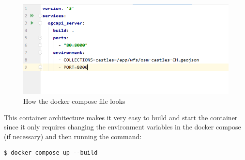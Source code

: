 \newline
\begin{figure}[H]
	\includegraphics[width=\linewidth]{./Images/ArchitectureDesign/dockercompose_image.png}
	\caption{How the docker compose file looks}
\end{figure}
This container architecture makes it very easy to build and start the container since it only requires changing the environment variables in the docker compose (if necessary) and then running the command:
\begin{verbatim}
$ docker compose up --build
\end{verbatim}
\newpage

